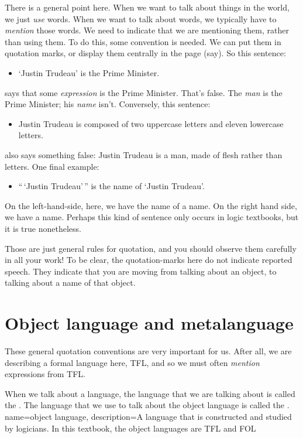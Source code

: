 There is a general point here. When we want to talk about things in the world, we just \emph{use} words. When we want to talk about words, we typically have to \emph{mention} those words. We need to indicate that we are mentioning them, rather than using them. To do this, some convention is needed. We can put them in quotation marks, or display them centrally in the page (say). So this sentence:
	\begin{itemize}
		\item `Justin Trudeau' is the Prime Minister.
	\end{itemize}
says that some \emph{expression} is the Prime Minister. That's false. The \emph{man} is the Prime Minister; his \emph{name} isn't. Conversely, this sentence:
	\begin{itemize}
		\item Justin Trudeau is composed of two uppercase letters and eleven lowercase letters.
	\end{itemize}
also says something false: Justin Trudeau is a man, made of flesh rather than letters. One final example:
	\begin{itemize}
		\item ``\,`Justin Trudeau'\,'' is the name of `Justin Trudeau'.
	\end{itemize} 
On the left-hand-side, here, we have the name of a name. On the right hand side, we have a name. Perhaps this kind of sentence only occurs in logic textbooks, but it is true nonetheless.

Those are just general rules for quotation, and you should observe them carefully in all your work! To be clear, the quotation-marks here do not indicate reported speech. They indicate that you are moving from talking about an object, to talking about a name of that object.


\section{Object language and metalanguage}
These general quotation conventions are very important for us. After all, we are describing a formal language here, TFL, and so we must often \emph{mention} expressions from TFL.

When we talk about a language, the language that we are talking about is called the . The language that we use to talk about the object language is called the .
\label{def.metalanguage}
{
name=object language,
description={A language that is constructed and studied by logicians. In this textbook,
 the object languages are TFL and FOL}
}

